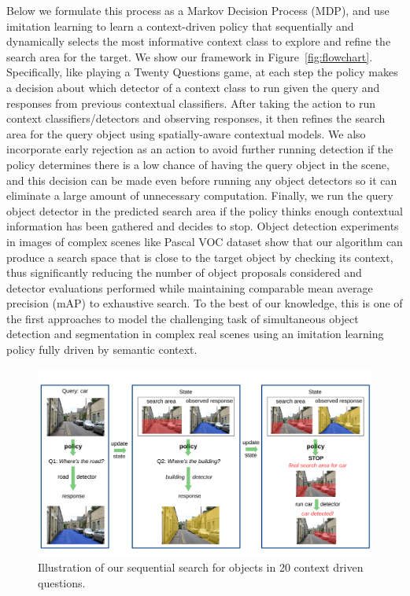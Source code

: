 Below we formulate this process as a Markov Decision Process (MDP), and use imitation learning to learn a context-driven policy that sequentially and dynamically selects the most informative context class to explore and refine the search area for the target. We show our framework in Figure~\ref{fig:flowchart}.  Specifically, like playing a Twenty Questions game, at each step the policy makes a decision about which detector of a context class to run given the query and responses from previous contextual classifiers. After taking the action to run context classifiers/detectors and observing responses, it then refines the search area for the query object using spatially-aware contextual models. We also incorporate early rejection as an action to avoid further running detection if the policy determines there is a low chance of having the query object in the scene, and this decision can be made even before running any object detectors so it can eliminate a large amount of unnecessary computation. Finally, we run the query object detector in the predicted search area if the policy thinks enough contextual information has been gathered and decides to stop. Object detection experiments in images of complex scenes like Pascal VOC dataset show that our algorithm can produce a search space that is close to the target object by checking its context, thus significantly reducing the number of object proposals considered and detector evaluations performed while maintaining comparable mean average precision (mAP) to exhaustive search. To the best of our knowledge, this is one of the first approaches to model the challenging task of simultaneous object detection and segmentation in complex real scenes using an imitation learning policy fully driven by semantic context.


\begin{figure}[htb]
\begin{center}
\includegraphics[width=\linewidth]{figures/iccv20q-overview.pdf}
\caption{Illustration of our sequential search for objects in 20 context driven questions.}
\label{fig:20Qintro}
\end{center}
\end{figure}

